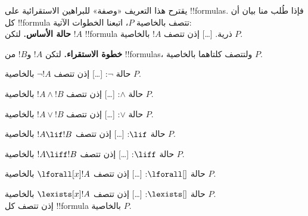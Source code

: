 \documentclass[../../../include/open-logic-section]{subfiles}
\begin{document}
\begin{explain}
يقترح هذا التعريف «وصفة» للبراهين الاستقرائية على !!{formula}s. فإذا
طُلب منا بيان أن كل !!{formula} تتصف بالخاصية $P$، اتبعنا الخطوات الآتية:\\

\textbf{حالة الأساس.} لتكن $!A$ !!{formula} ذرية. [\ldots]
إذن تتصف $!A$ بالخاصية $P$.

\textbf{خطوة الاستقراء.} لتكن $!A$ و$!B$ من !!{formula}s، ولتتصف
كلتاهما بالخاصية $P$.

حالة $\lnot$: [\ldots] إذن تتصف $\lnot !A$ بالخاصية $P$.

حالة $\land$: [\ldots] إذن تتصف $!A \land !B$ بالخاصية $P$.

حالة $\lor$: [\ldots] إذن تتصف $!A \lor !B$ بالخاصية $P$.

حالة $\lif$: [\ldots] إذن تتصف $!A \lif !B$ بالخاصية $P$.

حالة $\liff$: [\ldots] إذن تتصف $!A \liff !B$ بالخاصية $P$.

حالة $\lforall[]$: [\ldots] إذن تتصف $\lforall[x] !A$ بالخاصية $P$.

حالة $\lexists[]$: [\ldots] إذن تتصف $\lexists[x] !A$ بالخاصية $P$. \\

إذن تتصف كل !!{formula} بالخاصية $P$.
\end{explain}
\end{document}
